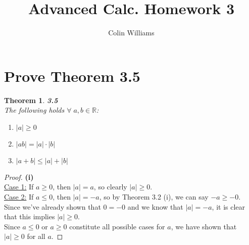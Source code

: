 \documentclass[10pt,a4paper]{article}
\title{Advanced Calc. Homework 3}
\author{Colin Williams}
\newtheorem*{theorem*}{Theorem}
\theoremstyle{definition}
\begin{document}
\maketitle

\section*{Prove Theorem 3.5}
\begin{theorem*}{\textbf{3.5}}
\\The following holds $\forall \; a,b \in \mathbb{R}$:
\begin{enumerate}[label = (\roman*)]
\item $|a| \geq 0$
\item $|ab| = |a| \cdot |b|$
\item $|a + b| \leq |a| + |b|$
\end{enumerate}
\end{theorem*}

\begin{proof}{\textbf{(i)}}
\\\underline{Case 1:} If $a \geq 0$, then $|a| = a$, so clearly $|a| \geq 0$.
\\\underline{Case 2:} If $a \leq 0$, then $|a| = -a$, so by Theorem 3.2 (i), we can say $-a \geq -0$. Since we've already shown that $0 = -0$ and we know that $|a| = -a$, it is clear that this implies $|a| \geq 0$.
\\Since $a \leq 0$ or $a \geq 0$ constitute all possible cases for $a$, we have shown that $|a| \geq 0$ for all $a$. 
\end{proof}
\end{document}

